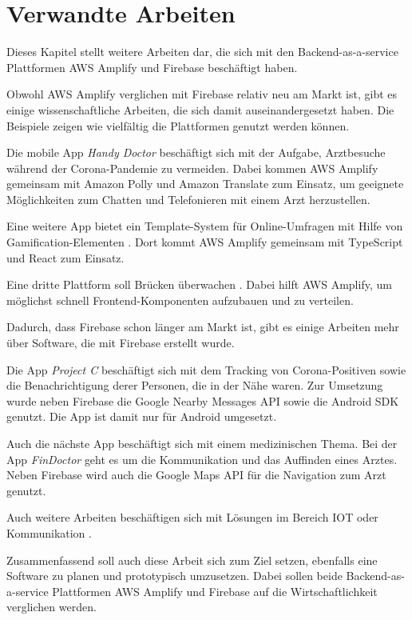 \chapter{Verwandte Arbeiten}

Dieses Kapitel stellt weitere Arbeiten dar, die sich mit den Backend-as-a-service Plattformen \ac{AWS} Amplify und Firebase beschäftigt haben.

Obwohl \ac{AWS} Amplify verglichen mit Firebase relativ neu am Markt ist, gibt es einige wissenschaftliche Arbeiten, die sich damit auseinandergesetzt haben. Die Beispiele zeigen wie vielfältig die Plattformen genutzt werden können.

Die mobile App \textit{Handy Doctor} \autocite{st2021handy} beschäftigt sich mit der Aufgabe, Arztbesuche während der Corona-Pandemie zu vermeiden. Dabei kommen \ac{AWS} Amplify gemeinsam mit Amazon Polly und Amazon Translate zum Einsatz, um geeignete Möglichkeiten zum Chatten und Telefonieren mit einem Arzt herzustellen.

Eine weitere App bietet ein Template-System für Online-Umfragen mit Hilfe von Gamification-Elementen \autocite{kuwamura2021application}. Dort kommt AWS Amplify gemeinsam mit TypeScript und React zum Einsatz.

Eine dritte Plattform soll Brücken überwachen \autocite{naraharisetty2021cloud}. Dabei hilft \ac{AWS} Amplify, um möglichst schnell Frontend-Komponenten aufzubauen und zu verteilen.

Dadurch, dass Firebase schon länger am Markt ist, gibt es einige Arbeiten mehr über Software, die mit Firebase erstellt wurde.

Die App \textit{Project C} \autocite{rahman2021project} beschäftigt sich mit dem Tracking von Corona-Positiven sowie die Benachrichtigung derer Personen, die in der Nähe waren. Zur Umsetzung wurde neben Firebase die Google Nearby Messages API sowie die Android SDK genutzt. Die App ist damit nur für Android umgesetzt.

Auch die nächste App beschäftigt sich mit einem medizinischen Thema. Bei der App \textit{FinDoctor} \autocite{rahmi2017findoctor} geht es um die Kommunikation und das Auffinden eines Arztes. Neben Firebase wird auch die Google Maps API für die Navigation zum Arzt genutzt.

Auch weitere Arbeiten beschäftigen sich mit Lösungen im Bereich IOT oder Kommunikation \autocite{li2018justiot} \autocite{sharma2019firebase} \autocite{bhadoria2020chatapp} \autocite{khawas2018application}.

Zusammenfassend soll auch diese Arbeit sich zum Ziel setzen, ebenfalls eine Software zu planen und prototypisch umzusetzen. Dabei sollen beide Backend-as-a-service Plattformen \ac{AWS} Amplify und Firebase auf die Wirtschaftlichkeit verglichen werden.